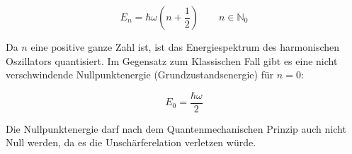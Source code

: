 \begin{equation}
  \label{eq:30}
  \boxed{E_n = \hbar\omega\left(n + \frac{1}{2}\right) \qquad n \in \mathbb N_0}
\end{equation}

Da \(n\) eine positive ganze Zahl ist, ist das Energiespektrum des harmonischen Oszillators quantisiert. Im Gegensatz zum Klassischen Fall gibt es eine nicht verschwindende Nullpunktenergie (Grundzustandsenergie) für \(n=0\):

\begin{equation}
  \label{eq:31}
  E_0 = \frac{\hbar\omega }{2}
\end{equation}

Die Nullpunktenergie darf nach dem Quantenmechanischen Prinzip auch nicht Null werden, da es die Unschärferelation verletzen würde.


